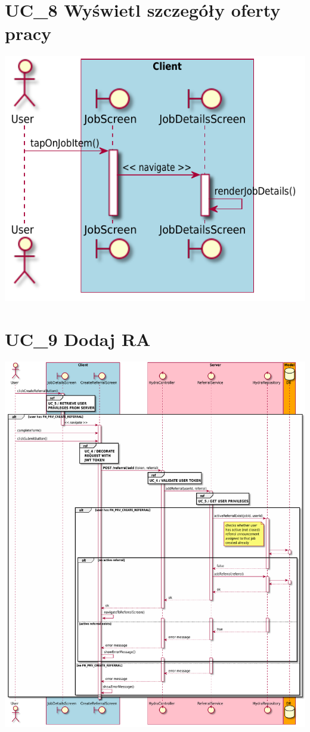 \documentclass[oneside]{scrreprt}
\begin{document}
\section{UC\_8 Wyświetl szczegóły oferty pracy}
\includegraphics[width=\textwidth, keepaspectratio]{graphics/sequence_diagram_job_details.pdf}

\section{UC\_9 Dodaj RA}
\includegraphics[width=\textwidth, keepaspectratio]{graphics/sequence_diagram_referral_add.pdf}
\end{document}
